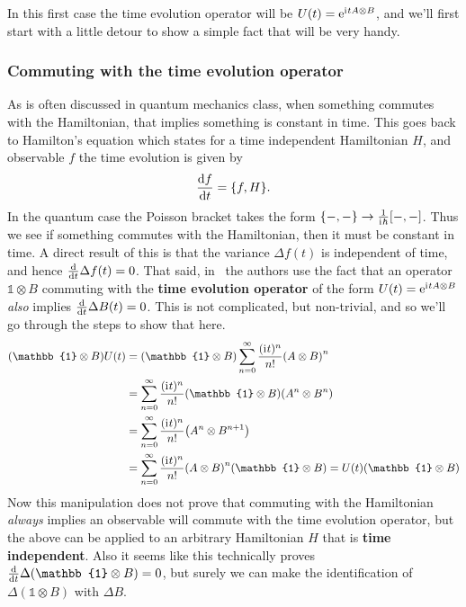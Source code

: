 \documentclass[11pt,english]{article}
\theoremstyle{definition}
\newcommand{\iu}{\mathrm{i}\mkern1mu}
\newcommand{\e}{\mathrm{e}}
\begin{document}
In this first case the time evolution operator will be $U(t) = \e^{\iu tA\otimes B}$, and we'll first start with a little detour to show a simple fact that will be very handy.

\subsubsection{Commuting with the time evolution operator}\label{sec:commuting-with-time}
As is often discussed in quantum mechanics class, when something commutes with the Hamiltonian, that implies something is constant in time. This goes back to Hamilton's equation which states for a time independent Hamiltonian $H$, and observable $f$ the time evolution is given by
\begin{equation*}
	\dv{f}{t} = \pb{f}{H}.
\end{equation*}
In the quantum case the Poisson bracket takes the form $\pb{-}{-}\to\frac{1}{\iu\hbar}\comm{-}{-}$. Thus we see if something commutes with the Hamiltonian, then it must be constant in time. A direct result of this is that the variance $\Delta f(t)$ is independent of time, and hence $\dv{t}\Delta f(t) = 0$. That said, in~\cite{dynamic-entropies} the authors use the fact that an operator $\mathbb{1}\otimes B$ commuting with the \textbf{time evolution operator} of the form $U(t) = \e^{\iu t A\otimes B}$ \emph{also} implies $\dv{t}\Delta B(t) = 0$. This is not complicated, but non-trivial, and so we'll go through the steps to show that here.
\begin{align*}
	\qty(\mathbb{1}\otimes B)U(t) & = \qty(\mathbb{1}\otimes B)\sum_{n = 0}^\infty\frac{(\iu t)^n}{n!}\qty(A\otimes B)^n                                  \\
	                              & = \sum_{n = 0}^\infty\frac{(\iu t)^n}{n!}\qty(\mathbb{1}\otimes B)\qty(A^n\otimes B^n)                                \\
	                              & = \sum_{n = 0}^\infty\frac{(\iu t)^n}{n!}\qty(A^n\otimes B^{n+1})                                                     \\
	                              & = \sum_{n = 0}^\infty\frac{(\iu t)^n}{n!}\qty(A\otimes B)^n\qty(\mathbb{1}\otimes B)  = U(t)\qty(\mathbb{1}\otimes B)
\end{align*}
Now this manipulation does not prove that commuting with the Hamiltonian \emph{always} implies an observable will commute with the time evolution operator, but the above can be applied to an arbitrary Hamiltonian $H$ that is \textbf{time independent}. Also it seems like this technically proves $\dv{t}\Delta(\mathbb{1}\otimes B) = 0$, but surely we can make the identification of $\Delta(\mathbb{1}\otimes B)$ with $\Delta B$.
\end{document}
